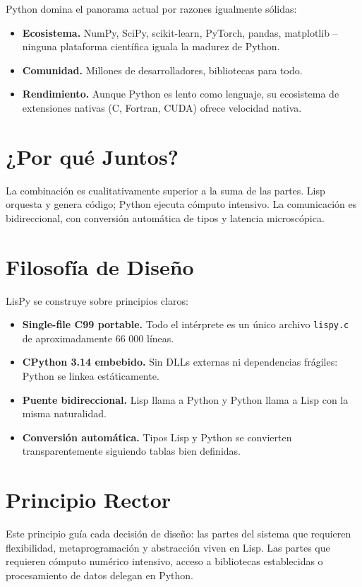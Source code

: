 Python domina el panorama actual por razones igualmente sólidas:

\begin{itemize}
\item \textbf{Ecosistema.} NumPy, SciPy, scikit-learn, PyTorch, pandas,
  matplotlib -- ninguna plataforma científica iguala la madurez de Python.
\item \textbf{Comunidad.} Millones de desarrolladores, bibliotecas para todo.
\item \textbf{Rendimiento.} Aunque Python es lento como lenguaje, su ecosistema
  de extensiones nativas (C, Fortran, CUDA) ofrece velocidad nativa.
\end{itemize}

\section{¿Por qué Juntos?}

La combinación es cualitativamente superior a la suma de las partes. Lisp
orquesta y genera código; Python ejecuta cómputo intensivo. La comunicación
es bidireccional, con conversión automática de tipos y latencia
microscópica.

\section{Filosofía de Diseño}

LisPy se construye sobre principios claros:

\begin{itemize}
\item \textbf{Single-file C99 portable.} Todo el intérprete es un único
  archivo \texttt{lispy.c} de aproximadamente 66 000 líneas.
\item \textbf{CPython 3.14 embebido.} Sin DLLs externas ni dependencias
  frágiles: Python se linkea estáticamente.
\item \textbf{Puente bidireccional.} Lisp llama a Python y Python llama a
  Lisp con la misma naturalidad.
\item \textbf{Conversión automática.} Tipos Lisp y Python se convierten
  transparentemente siguiendo tablas bien definidas.
\end{itemize}

\section{Principio Rector}

\medskip
\begin{center}
\end{center}
\medskip

Este principio guía cada decisión de diseño: las partes del sistema que
requieren flexibilidad, metaprogramación y abstracción viven en Lisp. Las
partes que requieren cómputo numérico intensivo, acceso a bibliotecas
establecidas o procesamiento de datos delegan en Python.
